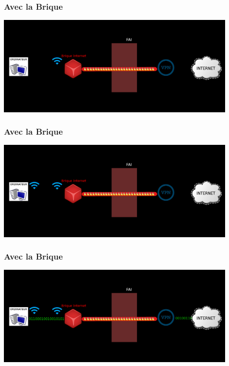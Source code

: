 \documentclass[notes=hide]{beamer}
\begin{document}
\begin{frame}[t]
\frametitle{\textcolor{titre}{Avec la Brique}}
		  \begin{center}
		  \includegraphics[width=0.9\textwidth]{img2/connexion14.png}
		  \end{center}
\end{frame}

\begin{frame}[t]
		  \frametitle{\textcolor{titre}{Avec la Brique}}
		  \begin{center}
		  \includegraphics[width=0.9\textwidth]{img2/connexion15.png}
		  \end{center}
\end{frame}


\begin{frame}[t]
		  \frametitle{\textcolor{titre}{Avec la Brique}}
		  \begin{center}
		  \includegraphics[width=0.9\textwidth]{img2/connexion16.png}
		  \end{center}
\end{frame}
\end{document}
